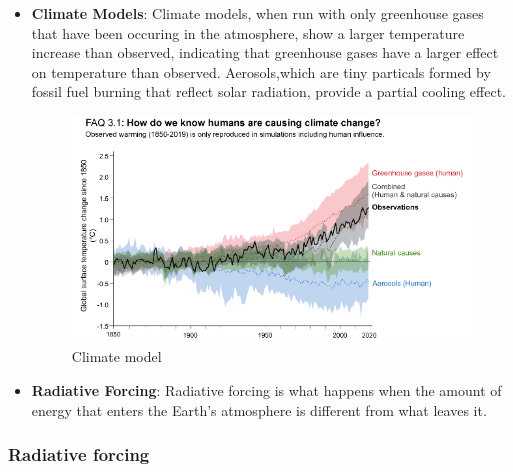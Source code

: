 \documentclass[../summary.tex]{subfiles}
\begin{document}
\begin{itemize}
	\item \textbf{Climate Models}: Climate models, when run with only greenhouse gases that have been occuring in the atmosphere, show a larger temperature increase than observed, indicating that greenhouse gases  have a larger effect on temperature than observed. Aerosols,which are tiny particals formed by fossil fuel burning that reflect solar radiation, provide a partial cooling effect.
	
	\begin{figure}[H]
		\centering
		\includegraphics[width=0.8\linewidth]{images/model}
		\caption{Climate model}
		\label{fig:model}
	\end{figure}
	
	
	\item \textbf{Radiative Forcing}: Radiative forcing is what happens when the amount of energy that enters the Earth's atmosphere is different from what leaves it.
\end{itemize}

\newpage

\subsubsection{Radiative forcing}
\end{document}

